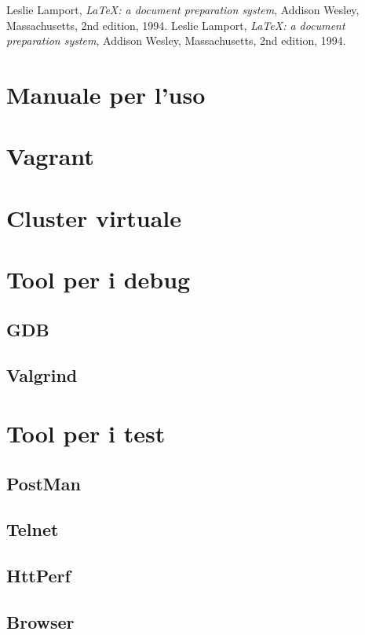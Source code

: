 \documentclass[italian]{tktltiki2}
\begin{document}
\newpage
%
%
\renewcommand{\refname}{\normalfont\selectfont\normalsize\textbf{Annotazioni}} 
\begin{thebibliography}{9}
  Leslie Lamport,
  \emph{\LaTeX: a document preparation system},
  Addison Wesley, Massachusetts,
  2nd edition,
  1994.
  Leslie Lamport,
  \emph{\LaTeX: a document preparation system},
  Addison Wesley, Massachusetts,
  2nd edition,
  1994.
  
\end{thebibliography}

\newpage
\appendix
 
\section{Manuale per l'uso}

\section{Vagrant}

\section{Cluster virtuale}

\section{Tool per i debug}
\subsection{GDB}
\subsection{Valgrind}

\section{Tool per i test}
\subsection{PostMan}
\subsection{Telnet}
\subsection{HttPerf}
\subsection{Browser}
\end{document}
